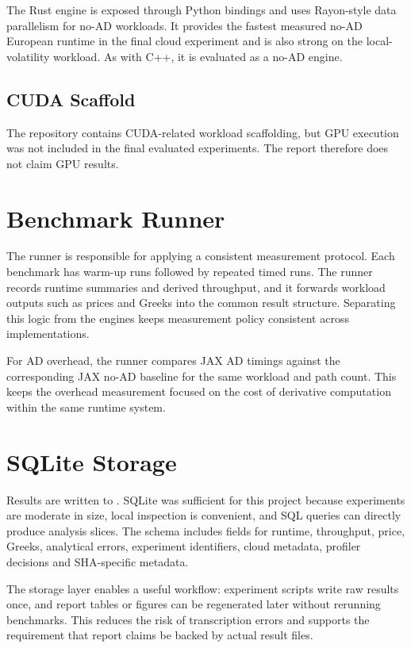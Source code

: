 The Rust engine is exposed through Python bindings and uses Rayon-style data parallelism for no-AD workloads. It provides the fastest measured no-AD European runtime in the final cloud experiment and is also strong on the local-volatility workload. As with C++, it is evaluated as a no-AD engine.

\subsection{CUDA Scaffold}

The repository contains CUDA-related workload scaffolding, but GPU execution was not included in the final evaluated experiments. The report therefore does not claim GPU results.

\section{Benchmark Runner}

The runner is responsible for applying a consistent measurement protocol. Each benchmark has warm-up runs followed by repeated timed runs. The runner records runtime summaries and derived throughput, and it forwards workload outputs such as prices and Greeks into the common result structure. Separating this logic from the engines keeps measurement policy consistent across implementations.

For AD overhead, the runner compares JAX AD timings against the corresponding JAX no-AD baseline for the same workload and path count. This keeps the overhead measurement focused on the cost of derivative computation within the same runtime system.

\section{SQLite Storage}

Results are written to . SQLite was sufficient for this project because experiments are moderate in size, local inspection is convenient, and SQL queries can directly produce analysis slices. The schema includes fields for runtime, throughput, price, Greeks, analytical errors, experiment identifiers, cloud metadata, profiler decisions and SHA-specific metadata.

The storage layer enables a useful workflow: experiment scripts write raw results once, and report tables or figures can be regenerated later without rerunning benchmarks. This reduces the risk of transcription errors and supports the requirement that report claims be backed by actual result files.

